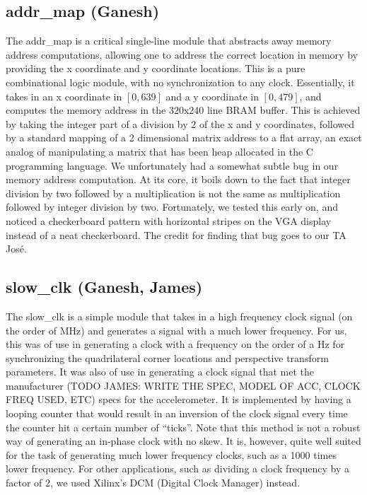 \documentclass{article}
\begin{document}
\subsection{addr\_map (Ganesh)}
The addr\_map is a critical single-line module that abstracts away memory address computations,
allowing one to address the correct location in memory by providing the x coordinate and y coordinate locations.
This is a pure combinational logic module, with no synchronization to any clock.
Essentially, it takes in an x coordinate in $[0, 639]$ and a y coordinate in $[0, 479]$,
and computes the memory address in the 320x240 line BRAM buffer.
This is achieved by taking the integer part of a division by 2 of the x and y coordinates,
followed by a standard mapping of a 2 dimensional matrix address to a flat array,
an exact analog of manipulating a matrix that has been heap allocated in the C programming language.
We unfortunately had a somewhat subtle bug in our memory address computation.
At its core, it boils down to the fact that integer division by two followed by a multiplication is not the same as multiplication followed by integer division by two.
Fortunately, we tested this early on, and noticed a checkerboard pattern with horizontal stripes on the VGA display instead of a neat checkerboard.
The credit for finding that bug goes to our TA Jos\'{e}.

\subsection{slow\_clk (Ganesh, James)}
The slow\_clk is a simple module that takes in a high frequency clock signal (on the order of MHz)
and generates a signal with a much lower frequency.
For us,
this was of use in generating a clock with a frequency on the order of a Hz for synchronizing the quadrilateral corner locations and perspective transform parameters.
It was also of use in generating a clock signal that met the manufacturer (TODO JAMES: WRITE THE SPEC, MODEL OF ACC, CLOCK FREQ USED, ETC) specs for the accelerometer.
It is implemented by having a looping counter that would result in an inversion of the clock signal every time the counter hit a certain number of ``ticks''.
Note that this method is not a robust way of generating an in-phase clock with no skew.
It is, however, quite well suited for the task of generating much lower frequency clocks, such as a 1000 times lower frequency.
For other applications, such as dividing a clock frequency by a factor of 2, we used Xilinx's DCM (Digital Clock Manager) instead.
\end{document}
